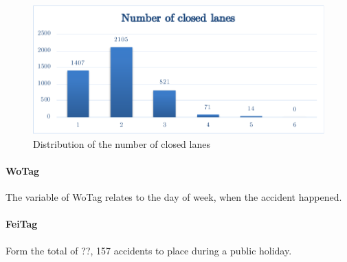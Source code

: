 \documentclass[a4paper,12pt]{report}
\begin{document}
\begin{figure}[H]
	\centering
	\includegraphics[scale=0.6]{./assets/baysis_dataset_Fstf.pdf}
	\caption{Distribution of the number of closed lanes}
	\label{img:baysis_dataset_Fstf}
\end{figure}

\paragraph{WoTag}
The variable of WoTag relates to the day of week, when the accident happened. 

\paragraph{FeiTag}
Form the total of ??, 157 accidents to place during a public holiday.
	
\end{document}
